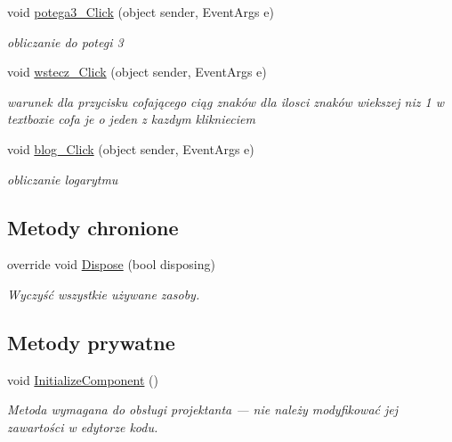 \begin{DoxyCompactItemize}
void \mbox{\hyperlink{classkalku__all__in__one_1_1_kalkulator_a727eb7b63c7316e937390df85f74aa90}{potega3\+\_\+\+Click}} (object sender, Event\+Args e)
\begin{DoxyCompactList}\small\item\em obliczanie do potegi 3 \end{DoxyCompactList}\item 
\mbox{\label{classkalku__all__in__one_1_1_kalkulator_a07fa7270a5526187f0a5691368f8383c}} 
void \mbox{\hyperlink{classkalku__all__in__one_1_1_kalkulator_a07fa7270a5526187f0a5691368f8383c}{wstecz\+\_\+\+Click}} (object sender, Event\+Args e)
\begin{DoxyCompactList}\small\item\em warunek dla przycisku cofającego ciąg znaków dla ilosci znaków wiekszej niz 1 w textboxie cofa je o jeden z kazdym kliknieciem \end{DoxyCompactList}\item 
\mbox{\label{classkalku__all__in__one_1_1_kalkulator_ae420a6c94547bb9a7f3dc7563ad3ccd7}} 
void \mbox{\hyperlink{classkalku__all__in__one_1_1_kalkulator_ae420a6c94547bb9a7f3dc7563ad3ccd7}{blog\+\_\+\+Click}} (object sender, Event\+Args e)
\begin{DoxyCompactList}\small\item\em obliczanie logarytmu \end{DoxyCompactList}\end{DoxyCompactItemize}
\subsection*{Metody chronione}
\begin{DoxyCompactItemize}
\item 
override void \mbox{\hyperlink{classkalku__all__in__one_1_1_kalkulator_a36b8f80b3fb28e7f3aed0b3a87374a17}{Dispose}} (bool disposing)
\begin{DoxyCompactList}\small\item\em Wyczyść wszystkie używane zasoby. \end{DoxyCompactList}\end{DoxyCompactItemize}
\subsection*{Metody prywatne}
\begin{DoxyCompactItemize}
\item 
void \mbox{\hyperlink{classkalku__all__in__one_1_1_kalkulator_a93058ddd473ac42a3bc101b648b0e3fe}{Initialize\+Component}} ()
\begin{DoxyCompactList}\small\item\em Metoda wymagana do obsługi projektanta — nie należy modyfikować jej zawartości w edytorze kodu. \end{DoxyCompactList}\end{DoxyCompactItemize}
